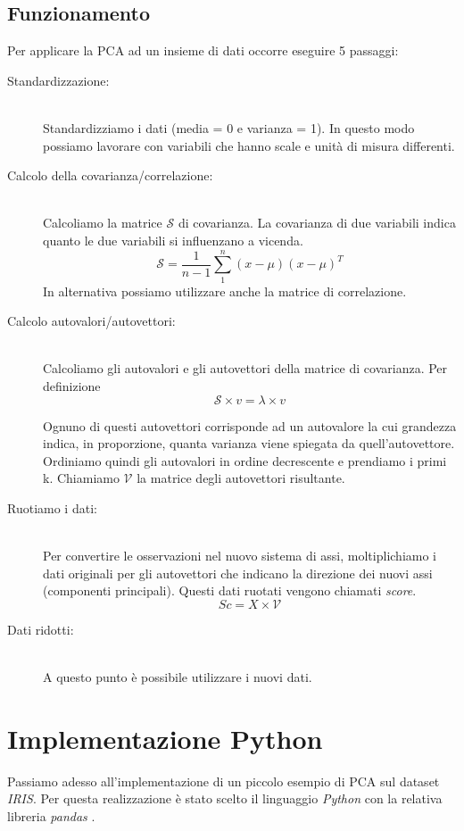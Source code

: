 \documentclass[12pt]{article}
\newcommand{\sectionline}{
	\begin{center}
		\resizebox{0.5\linewidth}{1ex}{
			\begin{tikzpicture}
			\node  (C) at (0,0) {};
			\node (D) at (9,0) {};
			\path (C) to [ornament=83] (D);
			\end{tikzpicture}
		}
	\end{center}
}
\begin{document}
	\subsection{Funzionamento}
		Per applicare la \ac{PCA} ad un insieme di dati occorre eseguire 5 passaggi:	
		\begin{description}
			\item[Standardizzazione:] \hfill \\
			 Standardizziamo i dati (media = 0 e varianza = 1). In questo modo possiamo lavorare con variabili che hanno scale e unità di misura differenti.
			\item[Calcolo della covarianza/correlazione:] \hfill \\
			Calcoliamo la matrice $\mathcal{S}$ di covarianza. La covarianza di due variabili indica quanto le due variabili si influenzano a vicenda.
			$$\mathcal{S} = \frac{1}{n-1} \sum_{1}^{n} (x-\mu)(x-\mu)^T$$
			In alternativa possiamo utilizzare anche la matrice di correlazione.
			\item[Calcolo autovalori/autovettori:] \hfill \\ 
			Calcoliamo gli autovalori e gli autovettori della matrice di covarianza. Per definizione $$\mathcal{S} \times v = \lambda \times v$$
			
			Ognuno di questi autovettori corrisponde ad un autovalore la cui grandezza indica, in proporzione, quanta varianza viene spiegata da quell'autovettore. Ordiniamo quindi gli autovalori in ordine decrescente e prendiamo i primi k. Chiamiamo $\mathcal{V}$ la matrice degli autovettori risultante.
			\item[Ruotiamo i dati:] \hfill \\
			Per convertire le osservazioni nel nuovo sistema di assi, moltiplichiamo i dati originali per gli autovettori che indicano la direzione dei nuovi assi (componenti principali). Questi dati ruotati vengono chiamati \emph{score}. $$Sc = X \times \mathcal{V}$$
			\item[Dati ridotti:] \hfill \\
			A questo punto è possibile utilizzare i nuovi dati.
		\end{description}
	
	\sectionline
	
\section{Implementazione Python}

	Passiamo adesso all'implementazione di un piccolo esempio di \ac{PCA} sul dataset \emph{IRIS}. Per questa realizzazione è stato scelto il linguaggio \emph{Python} con la relativa libreria \emph{pandas} \cite{pandasSite}.
\end{document}
